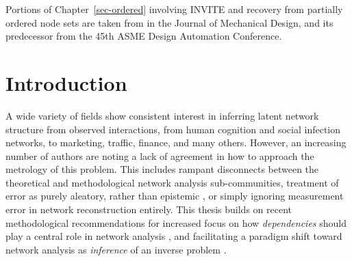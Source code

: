\documentclass[%
	12pt,
		oneside,
		letterpaper
]{book}
\renewcommand{\contentsname}%
    {Table of contents}%
\renewcommand*\contentsname{Table of contents}
\newcommand\contentsname{Table of contents}
\begin{document}
Portions of Chapter~\ref{sec-ordered} involving INVITE and recovery from partially ordered node sets are taken from \textcite{OrganizingTaggedKnowledge_Sexton2020} in the Journal of Mechanical Design, and its predecessor \textcite{UsingSemanticFluency_Sexton2019} from the 45th ASME Design Automation Conference.



\thispagestyle{empty}
\singlespacing
\small\normalsize
{}
    \renewcommand{\contentsname}{Table of Contents}
\tableofcontents %
\clearpage


    \renewcommand{\contentsname}{List of Tables}
\listoftables %
\clearpage

    \renewcommand{\contentsname}{List of Figures}
\listoffigures %
\clearpage

% 

\setlength{\parskip}{0em}
\doublespacing
\small\normalsize



\chapter{Introduction}\label{introduction}

A wide variety of fields show consistent interest in inferring latent network structure from observed interactions, from human cognition and social infection networks, to marketing, traffic, finance, and many others. \autocite{Inferringnetworksdiffusion_GomezRodriguez2012}
However, an increasing number of authors are noting a lack of agreement in how to approach the metrology of this problem.
This includes rampant disconnects between the theoretical and methodological network analysis sub-communities\autocite{Statisticalinferencelinks_Peel2022}, treatment of error as purely aleatory, rather than epistemic \autocite{Measurementerrornetwork_Wang2012}, or simply ignoring measurement error in network reconstruction entirely\autocite{ReconstructingNetworksUnknown_Peixoto2018}.
This thesis builds on recent methodological recommendations for increased focus on how \emph{dependencies} should play a central role in network analysis \autocite{WhyHowWhen_Torres2021}, and facilitating a paradigm shift toward network analysis as \emph{inference} of an inverse problem \autocite{Statisticalinferencelinks_Peel2022}.
\end{document}
